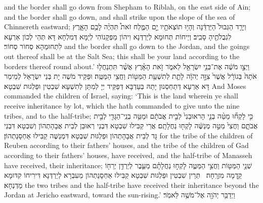 {and the border shall go down from Shepham to Riblah, on the east side of Ain; and the border shall go down, and shall strike upon the slope of the sea of Chinnereth eastward;}{}
{וְיָרַ֤ד הַגְּבוּל֙ הַיַּרְדֵּ֔נָה וְהָי֥וּ תוֹצְאֹתָ֖יו יָ֣ם הַמֶּ֑לַח זֹאת֩ תִּהְיֶ֨ה לָכֶ֥ם הָאָ֛רֶץ לִגְבֻלֹתֶ֖יהָ סָבִֽיב׃}
{וְיֵיחוֹת תְּחוּמָא לְיַרְדְּנָא וִיהוֹן מַפְּקָנוֹהִי לְיַמָּא דְּמִלְחָא דָּא תְּהֵי לְכוֹן אַרְעָא לִתְחוּמַהָא סְחוֹר סְחוֹר׃}
{and the border shall go down to the Jordan, and the goings out thereof shall be at the Salt Sea; this shall be your land according to the borders thereof round about.’}{}
{וַיְצַ֣ו מֹשֶׁ֔ה אֶת־בְּנֵ֥י יִשְׂרָאֵ֖ל לֵאמֹ֑ר זֹ֣את הָאָ֗רֶץ אֲשֶׁ֨ר תִּתְנַחֲל֤וּ אֹתָהּ֙ בְּגוֹרָ֔ל אֲשֶׁר֙ צִוָּ֣ה יְהֹוָ֔ה לָתֵ֛ת לְתִשְׁעַ֥ת הַמַּטּ֖וֹת וַחֲצִ֥י הַמַּטֶּֽה׃}
{וּפַקֵּיד מֹשֶׁה יָת בְּנֵי יִשְׂרָאֵל לְמֵימַר דָּא אַרְעָא דְּתַחְסְנוּן יָתַהּ בְּעַדְבָּא דְּפַקֵּיד יְיָ לְמִתַּן לְתִשְׁעָא שִׁבְטִין וּפַלְגוּת שִׁבְטָא׃}
{And Moses commanded the children of Israel, saying: ‘This is the land wherein ye shall receive inheritance by lot, which the \lord\space hath commanded to give unto the nine tribes, and to the half-tribe;}{}
{כִּ֣י לָקְח֞וּ מַטֵּ֨ה בְנֵ֤י הָראוּבֵנִי֙ לְבֵ֣ית אֲבֹתָ֔ם וּמַטֵּ֥ה בְנֵֽי־הַגָּדִ֖י לְבֵ֣ית אֲבֹתָ֑ם וַחֲצִי֙ מַטֵּ֣ה מְנַשֶּׁ֔ה לָקְח֖וּ נַחֲלָתָֽם׃}
{אֲרֵי קַבִּילוּ שִׁבְטָא דִּבְנֵי רְאוּבֵן לְבֵית אֲבָהָתְהוֹן וְשִׁבְטָא דִּבְנֵי גָּד לְבֵית אֲבָהָתְהוֹן וּפַלְגוּת שִׁבְטָא דִּמְנַשֶּׁה קַבִּילוּ אַחְסָנַתְהוֹן׃}
{for the tribe of the children of Reuben according to their fathers’ houses, and the tribe of the children of Gad according to their fathers’ houses, have received, and the half-tribe of Manasseh have received, their inheritance;}{}
{שְׁנֵ֥י הַמַּטּ֖וֹת וַחֲצִ֣י הַמַּטֶּ֑ה לָקְח֣וּ נַחֲלָתָ֗ם מֵעֵ֛בֶר לְיַרְדֵּ֥ן יְרֵח֖וֹ קֵ֥דְמָה מִזְרָֽחָה׃ \petucha 
{}}
{תְּרֵין שִׁבְטִין וּפַלְגוּת שִׁבְטָא קַבִּילוּ אַחְסָנַתְהוֹן מֵעִבְרָא לְיַרְדְּנָא דִּירִיחוֹ קִדּוּמָא מַדְנְחָא׃}
{the two tribes and the half-tribe have received their inheritance beyond the Jordan at Jericho eastward, toward the sun-rising.’}{}
{וַיְדַבֵּ֥ר יְהֹוָ֖ה אֶל־מֹשֶׁ֥ה לֵּאמֹֽר׃}
